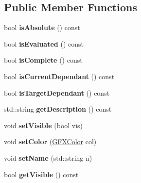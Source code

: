 \subsection*{Public Member Functions}
\begin{DoxyCompactItemize}
\item 
bool {\bfseries is\+Absolute} () const \hypertarget{classNavPath_a5d98f6989c07d3e7e6c04ad40fefb5c2}{}\label{classNavPath_a5d98f6989c07d3e7e6c04ad40fefb5c2}

\item 
bool {\bfseries is\+Evaluated} () const \hypertarget{classNavPath_aa4f305bef6069d86d94066f1a7f98682}{}\label{classNavPath_aa4f305bef6069d86d94066f1a7f98682}

\item 
bool {\bfseries is\+Complete} () const \hypertarget{classNavPath_af2b224525e222b04ae636a41e6f6f69f}{}\label{classNavPath_af2b224525e222b04ae636a41e6f6f69f}

\item 
bool {\bfseries is\+Current\+Dependant} () const \hypertarget{classNavPath_aaa3b3eede7fb937712b20f6b2b409df9}{}\label{classNavPath_aaa3b3eede7fb937712b20f6b2b409df9}

\item 
bool {\bfseries is\+Target\+Dependant} () const \hypertarget{classNavPath_abf767e66143d51ba5a7a269fe1e82980}{}\label{classNavPath_abf767e66143d51ba5a7a269fe1e82980}

\item 
std\+::string {\bfseries get\+Description} () const \hypertarget{classNavPath_ae6ef3d064a9619e2d620e8e9a6402d15}{}\label{classNavPath_ae6ef3d064a9619e2d620e8e9a6402d15}

\item 
void {\bfseries set\+Visible} (bool vis)\hypertarget{classNavPath_af07e105cecb68d8113c71e066fd5a19d}{}\label{classNavPath_af07e105cecb68d8113c71e066fd5a19d}

\item 
void {\bfseries set\+Color} (\hyperlink{structGFXColor}{G\+F\+X\+Color} col)\hypertarget{classNavPath_a6c1d8c0c77e9a867540e0d4311b91a56}{}\label{classNavPath_a6c1d8c0c77e9a867540e0d4311b91a56}

\item 
void {\bfseries set\+Name} (std\+::string n)\hypertarget{classNavPath_ae5b0ad00646f77c9bd7335ce4c25b3ea}{}\label{classNavPath_ae5b0ad00646f77c9bd7335ce4c25b3ea}

\item 
bool {\bfseries get\+Visible} () const \hypertarget{classNavPath_a8365396d71624b3ccc752466a519d32c}{}\label{classNavPath_a8365396d71624b3ccc752466a519d32c}


\end{DoxyCompactItemize}
